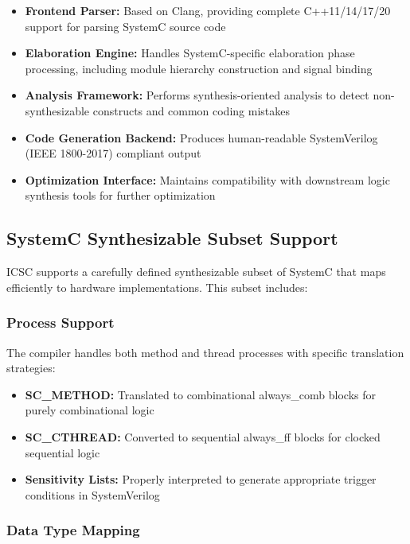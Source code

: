 \begin{itemize}
\item \textbf{Frontend Parser:} Based on Clang, providing complete C++11/14/17/20 support for parsing SystemC source code
\item \textbf{Elaboration Engine:} Handles SystemC-specific elaboration phase processing, including module hierarchy construction and signal binding
\item \textbf{Analysis Framework:} Performs synthesis-oriented analysis to detect non-synthesizable constructs and common coding mistakes
\item \textbf{Code Generation Backend:} Produces human-readable SystemVerilog (IEEE 1800-2017) compliant output
\item \textbf{Optimization Interface:} Maintains compatibility with downstream logic synthesis tools for further optimization
\end{itemize}

\subsection{SystemC Synthesizable Subset Support}
\label{subsec:systemc_subset}

ICSC supports a carefully defined synthesizable subset of SystemC that maps efficiently to hardware implementations. This subset includes:

\subsubsection{Process Support}
\label{subsubsec:process_support}

The compiler handles both method and thread processes with specific translation strategies:

\begin{itemize}
\item \textbf{SC\_METHOD:} Translated to combinational always\_comb blocks for purely combinational logic
\item \textbf{SC\_CTHREAD:} Converted to sequential always\_ff blocks for clocked sequential logic
\item \textbf{Sensitivity Lists:} Properly interpreted to generate appropriate trigger conditions in SystemVerilog
\end{itemize}

\subsubsection{Data Type Mapping}
\label{subsubsec:data_type_mapping}

